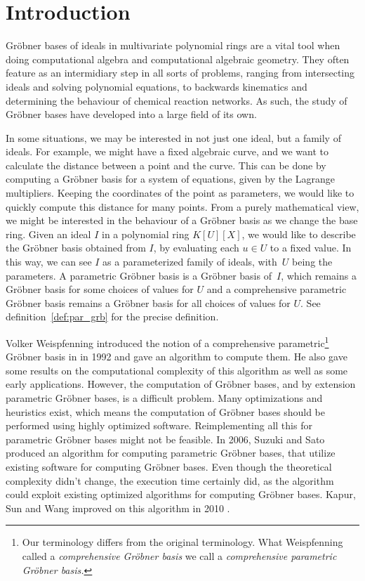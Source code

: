 \section*{Introduction}
Gröbner bases of ideals in multivariate polynomial rings are a vital tool when doing computational algebra and computational algebraic geometry. They often feature as an intermidiary step in all sorts of problems, ranging from intersecting ideals and solving polynomial equations, to backwards kinematics and determining the behaviour of chemical reaction networks\cite{IVA}. As such, the study of Gröbner bases have developed into a large field of its own.

In some situations, we may be interested in not just one ideal, but a family of ideals. For example, we might have a fixed algebraic curve, and we want to calculate the distance between a point and the curve. This can be done by computing a Gröbner basis for a system of equations, given by the Lagrange multipliers. Keeping the coordinates of the point as parameters, we would like to quickly compute this distance for many points. From a purely mathematical view, we might be interested in the behaviour of a Gröbner basis as we change the base ring. Given an ideal $I$ in a polynomial ring $K[U][X]$, we would like to describe the Gröbner basis obtained from $I$, by evaluating each $u \in U$ to a fixed value. In this way, we can see $I$ as a parameterized family of ideals, with $\,U$ being the parameters. A parametric Gröbner basis is a Gröbner basis of $\,I$, which remains a Gröbner basis for some choices of values for $U$ and a comprehensive parametric Gröbner basis remains a Gröbner basis for all choices of values for $U$. See definition~\ref{def:par_grb} for the precise definition.

Volker Weispfenning introduced the notion of a comprehensive parametric\footnote{Our terminology differs from the original terminology. What Weispfenning called a \textit{comprehensive Gröbner basis} we call a \textit{comprehensive parametric Gröbner basis.}} Gröbner basis in \cite{Weispfenning} in 1992 and gave an algorithm to compute them. He also gave some results on the computational complexity of this algorithm as well as some early applications. However, the computation of Gröbner bases, and by extension parametric Gröbner bases, is a difficult problem. Many optimizations and heuristics exist, which means the computation of Gröbner bases should be performed using highly optimized software. Reimplementing all this for parametric Gröbner bases might not be feasible. In 2006, Suzuki and Sato produced an algorithm for computing parametric Gröbner bases, that utilize existing software for computing Gröbner bases. Even though the theoretical complexity didn't change, the execution time certainly did, as the algorithm could exploit existing optimized algorithms for computing Gröbner bases. Kapur, Sun and Wang improved on this algorithm in 2010 \cite{KAPUR201327}\cite{10.1145/1837934.1837946}.

